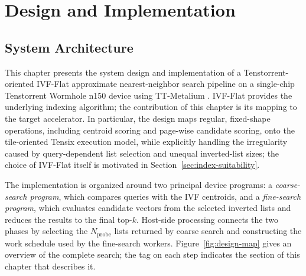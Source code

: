 \chapter{Design and Implementation}
\label{chap:design-implementation}

\usetikzlibrary{positioning,calc,fit,decorations.pathreplacing}


\section{System Architecture}
\label{sec:system-architecture}
This chapter presents the system design and implementation of a Tenstorrent-oriented IVF-Flat approximate nearest-neighbor search pipeline on a single-chip Tenstorrent Wormhole n150 device using TT-Metalium \cite{tenstorrent_metalium_architecture,tenstorrent_wormhole_spec}. IVF-Flat provides the underlying indexing algorithm; the contribution of this chapter is its mapping to the target accelerator. In particular, the design maps regular, fixed-shape operations, including centroid scoring and page-wise candidate scoring, onto the tile-oriented Tensix execution model, while explicitly handling the irregularity caused by query-dependent list selection and unequal inverted-list sizes; the choice of IVF-Flat itself is motivated in Section~\ref{sec:index-suitability}.

The implementation is organized around two principal device programs: a \emph{coarse-search program}, which compares queries with the IVF centroids, and a \emph{fine-search program}, which evaluates candidate vectors from the selected inverted lists and reduces the results to the final top-\(k\). Host-side processing connects the two phases by selecting the \(N_{\mathrm{probe}}\) lists returned by coarse search and constructing the work schedule used by the fine-search workers. Figure~\ref{fig:design-map} gives an overview of the complete search; the tag on each step indicates the section of this chapter that describes it.

